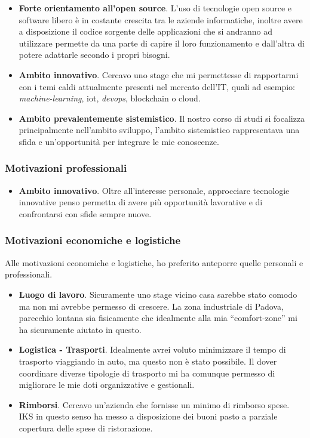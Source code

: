 \begin{itemize}
    \item \textbf{Forte orientamento all'open source}. L'uso di tecnologie open source e software libero è in costante crescita tra le aziende informatiche, inoltre avere a disposizione il codice sorgente delle applicazioni che si andranno ad utilizzare permette da una parte di capire il loro funzionamento e dall'altra di potere adattarle secondo i propri bisogni. 
    \item \textbf{Ambito innovativo}. Cercavo uno stage che mi permettesse di rapportarmi con i temi caldi attualmente presenti nel mercato dell'IT, quali ad esempio: \textit{\gls{machine-learning}}, \gls{iot}, \textit{devops}, \gls{blockchain} o \gls{cloud}.
    \item \textbf{Ambito prevalentemente sistemistico}. Il nostro corso di studi si focalizza principalmente nell'ambito sviluppo, l'ambito sistemistico rappresentava una sfida e un'opportunità per integrare le mie conoscenze.
\end{itemize}

\subsubsection{Motivazioni professionali}

\begin{itemize}
    \item \textbf{Ambito innovativo}. Oltre all'interesse personale, approcciare tecnologie innovative penso permetta di avere più opportunità lavorative e di confrontarsi con sfide sempre nuove. 
\end{itemize}

\subsubsection{Motivazioni economiche e logistiche}

Alle motivazioni economiche e logistiche, ho preferito anteporre quelle personali e professionali. 

\begin{itemize}
    \item \textbf{Luogo di lavoro}. Sicuramente uno stage vicino casa sarebbe stato comodo ma non mi avrebbe permesso di crescere. La zona industriale di Padova, parecchio lontana sia fisicamente che idealmente alla mia ``comfort-zone'' mi ha sicuramente aiutato in questo.
    \item \textbf{Logistica - Trasporti}. Idealmente avrei voluto minimizzare il tempo di trasporto viaggiando in auto, ma questo non è stato possibile. Il dover coordinare diverse tipologie di trasporto mi ha comunque permesso di migliorare le mie doti organizzative e gestionali. 
    \item \textbf{Rimborsi}. Cercavo un'azienda che fornisse un minimo di rimborso spese. IKS in questo senso ha messo a disposizione dei buoni pasto a parziale copertura delle spese di ristorazione.
\end{itemize}

